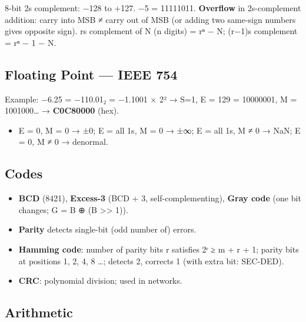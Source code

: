 \endgroup

8-bit 2\textquotesingle s complement: −128 to +127. −5 = 11111011.
\textbf{Overflow} in 2\textquotesingle s-complement addition: carry into MSB ≠ carry out of MSB (or adding two same-sign numbers gives opposite sign).
r\textquotesingle s complement of N (n digits) = rⁿ − N; (r−1)\textquotesingle s complement = rⁿ − 1 − N.

\needspace{95pt}

\hypertarget{p2-02--22-floating-point--ieee-754}{%
\subsection{Floating Point --- IEEE 754}\label{p2-02--22-floating-point--ieee-754}}



Example: −6.25 = −110.01₂ = −1.1001 × 2² → S=1, E = 129 = 10000001, M = 1001000\ldots{}
→ \textbf{C0C80000} (hex).

\begin{itemize}
\tightlist
\item
  E = 0, M = 0 → ±0; E = all 1s, M = 0 → ±∞; E = all 1s, M ≠ 0 → NaN; E = 0, M ≠ 0 → denormal.
\end{itemize}

\needspace{95pt}

\hypertarget{p2-02--23-codes}{%
\subsection{Codes}\label{p2-02--23-codes}}

\begin{itemize}
\tightlist
\item
  \textbf{BCD} (8421), \textbf{Excess-3} (BCD + 3, self-complementing), \textbf{Gray code} (one bit changes; G = B ⊕ (B \textgreater\textgreater{} 1)).
\item
  \textbf{Parity} detects single-bit (odd number of) errors.
\item
  \textbf{Hamming code}: number of parity bits r satisfies 2ʳ ≥ m + r + 1; parity bits at positions 1, 2, 4, 8 \ldots; detects 2, corrects 1 (with extra bit: SEC-DED).
\item
  \textbf{CRC}: polynomial division; used in networks.
\end{itemize}

\needspace{95pt}

\hypertarget{p2-02--24-arithmetic}{%
\subsection{Arithmetic}\label{p2-02--24-arithmetic}}

